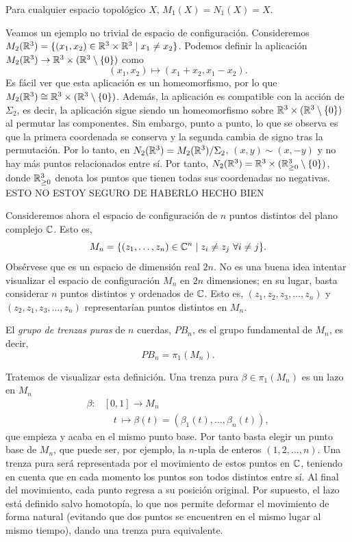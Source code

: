 \documentclass[TFG.tex]{subfiles}
\begin{document}
\begin{observacion}
Para cualquier espacio topológico $X$, $M_1(X)=N_1(X)=X$.
\end{observacion}

\begin{ej}
Veamos un ejemplo no trivial de espacio de configuración. Consideremos $M_2(\mathbb{R}^3)=\{(x_1,x_2)\in\mathbb{R}^3\times\mathbb{R}^3\mid x_1\neq x_2\}$. Podemos definir la aplicación $M_2(\mathbb{R}^3)\to \mathbb{R}^3\times(\mathbb{R}^3\setminus\{0\})$ como
\[
(x_1,x_2)\mapsto (x_1+x_2,x_1-x_2).
\]
Es fácil ver que esta aplicación es un homeomorfismo, por lo que $M_2(\mathbb{R}^3)\cong \mathbb{R}^3\times(\mathbb{R}^3\setminus\{0\})$. Además, la aplicación es compatible con la acción de $\Sigma_2$, es decir, la aplicación sigue siendo un homeomorfismo sobre $\mathbb{R}^3\times(\mathbb{R}^3\setminus\{0\})$ al permutar las componentes. Sin embargo, punto a punto, lo que se observa es que la primera coordenada se conserva y la segunda cambia de signo tras la permutación. Por lo tanto, en $N_2(\mathbb{R}^3)=M_2(\mathbb{R}^3)/\Sigma_2$, $(x,y)\sim (x,-y)$ y no hay más puntos relacionados entre sí. Por tanto, $N_2(\mathbb{R}^3)=\mathbb{R}^3\times(\mathbb{R}^3_{\geq 0}\setminus\{0\})$, donde $\mathbb{R}^3_{\geq 0}$ denota los puntos que tienen todas sus coordenadas no negativas. ESTO NO ESTOY SEGURO DE HABERLO HECHO BIEN

\end{ej}


Consideremos ahora el espacio de configuración de $n$ puntos distintos del plano complejo $\mathbb{C}$. Esto es,
$$M_n=\{(z_1,\dots,z_n)\in\C^n\mid z_i\neq z_j\ \forall i\neq j\}.$$ 
Obsérvese que es un espacio de dimensión real $2n$. No es una buena idea intentar visualizar el espacio de configuración $M_n$ en $2n$ dimensiones; en su lugar, basta considerar $n$ puntos distintos y ordenados de $\mathbb{C}$. Esto es, $(z_1,z_2,z_3,\dots, z_n)$ y $(z_2,z_1,z_3,\dots, z_n)$ representarían puntos distintos en $M_n$. 
\begin{defi}
El \emph{grupo de trenzas puras} de $n$ cuerdas, $PB_n$, es el grupo fundamental de $M_n$, es decir,
$$PB_n=\pi_1(M_n).$$
\end{defi}

Tratemos de visualizar esta definición. Una trenza pura $\beta\in\pi_1(M_n)$ es un lazo en $M_n$
\begin{align*}
\beta: & [0,1]\to M_n\\
& \quad t\ \mapsto \beta(t)= (\beta_1(t),\dots, \beta_n(t)),
\end{align*}
que empieza y acaba en el mismo punto base. Por tanto basta elegir un punto base de $M_n$, que puede ser, por ejemplo, la $n$-upla de enteros $(1,2,\dots, n)$. Una trenza pura será representada por el movimiento de estos puntos en $\mathbb{C}$, teniendo en cuenta que en cada momento los puntos son todos distintos entre sí. Al final del movimiento, cada punto regresa a su posición original. Por supuesto, el lazo está definido salvo homotopía, lo que nos permite deformar el movimiento de forma natural (evitando que dos puntos se encuentren en el mismo lugar al mismo tiempo), dando una trenza pura equivalente.
\end{document}
